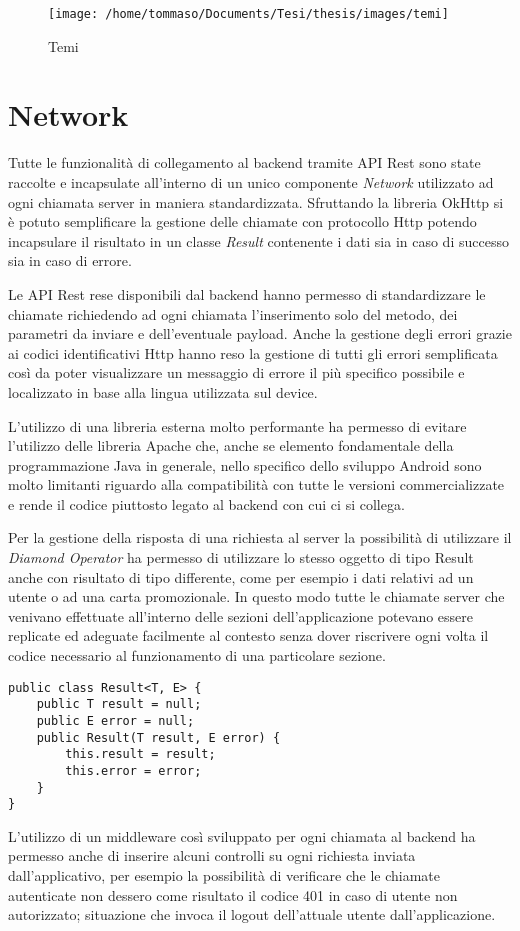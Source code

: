 \begin{figure}[bh]
\texttt{[image: /home/tommaso/Documents/Tesi/thesis/images/temi]}\caption{\label{fig:Temi}Temi}
\end{figure}


\section{Network}

Tutte le funzionalità di collegamento al backend tramite API Rest
sono state raccolte e incapsulate all'interno di un unico componente
\emph{Network} utilizzato ad ogni chiamata server in maniera standardizzata.
Sfruttando la libreria OkHttp si è potuto semplificare la gestione
delle chiamate con protocollo Http potendo incapsulare il risultato
in un classe \emph{Result} contenente i dati sia in caso di successo
sia in caso di errore.

Le API Rest rese disponibili dal backend hanno permesso di standardizzare
le chiamate richiedendo ad ogni chiamata l'inserimento solo del metodo,
dei parametri da inviare e dell'eventuale payload. Anche la gestione
degli errori grazie ai codici identificativi Http hanno reso la gestione
di tutti gli errori semplificata così da poter visualizzare un messaggio
di errore il più specifico possibile e localizzato in base alla lingua
utilizzata sul device.

L'utilizzo di una libreria esterna molto performante ha permesso di
evitare l'utilizzo delle libreria Apache che, anche se elemento fondamentale
della programmazione Java in generale, nello specifico dello sviluppo
Android sono molto limitanti riguardo alla compatibilità con tutte
le versioni commercializzate e rende il codice piuttosto legato al
backend con cui ci si collega.

Per la gestione della risposta di una richiesta al server la possibilità
di utilizzare il \emph{Diamond Operator} ha permesso di utilizzare
lo stesso oggetto di tipo Result anche con risultato di tipo differente,
come per esempio i dati relativi ad un utente o ad una carta promozionale.
In questo modo tutte le chiamate server che venivano effettuate all'interno
delle sezioni dell'applicazione potevano essere replicate ed adeguate
facilmente al contesto senza dover riscrivere ogni volta il codice
necessario al funzionamento di una particolare sezione.

\begin{lstlisting}
public class Result<T, E> {
    public T result = null;
    public E error = null;
    public Result(T result, E error) {
        this.result = result;
        this.error = error;
    }
}
\end{lstlisting}
L'utilizzo di un middleware così sviluppato per ogni chiamata al backend
ha permesso anche di inserire alcuni controlli su ogni richiesta inviata
dall'applicativo, per esempio la possibilità di verificare che le
chiamate autenticate non dessero come risultato il codice 401 in caso
di utente non autorizzato; situazione che invoca il logout dell'attuale
utente dall'applicazione.

